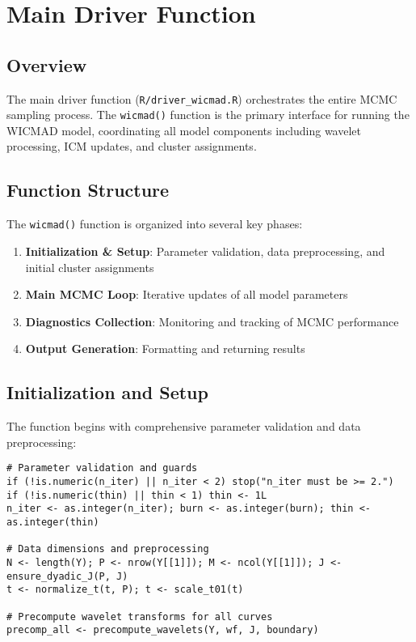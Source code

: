 \documentclass[11pt]{article}
\begin{document}
\section{Main Driver Function}

\subsection{Overview}

The main driver function (\texttt{R/driver\_wicmad.R}) orchestrates the entire MCMC sampling process. The \texttt{wicmad()} function is the primary interface for running the WICMAD model, coordinating all model components including wavelet processing, ICM updates, and cluster assignments.

\subsection{Function Structure}

The \texttt{wicmad()} function is organized into several key phases:

\begin{enumerate}
    \item \textbf{Initialization \& Setup}: Parameter validation, data preprocessing, and initial cluster assignments
    \item \textbf{Main MCMC Loop}: Iterative updates of all model parameters
    \item \textbf{Diagnostics Collection}: Monitoring and tracking of MCMC performance
    \item \textbf{Output Generation}: Formatting and returning results
\end{enumerate}

\subsection{Initialization and Setup}

The function begins with comprehensive parameter validation and data preprocessing:

\begin{lstlisting}
# Parameter validation and guards
if (!is.numeric(n_iter) || n_iter < 2) stop("n_iter must be >= 2.")
if (!is.numeric(thin) || thin < 1) thin <- 1L
n_iter <- as.integer(n_iter); burn <- as.integer(burn); thin <- as.integer(thin)

# Data dimensions and preprocessing
N <- length(Y); P <- nrow(Y[[1]]); M <- ncol(Y[[1]]); J <- ensure_dyadic_J(P, J)
t <- normalize_t(t, P); t <- scale_t01(t)

# Precompute wavelet transforms for all curves
precomp_all <- precompute_wavelets(Y, wf, J, boundary)
\end{lstlisting}
\end{document}
